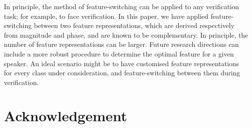 \documentclass{article}
\begin{document}
In principle, the method of feature-switching can be applied to any verification
task; for example, to face verification. In this paper, we have applied
feature-switching between two feature representations, which are derived
respectively from magnitude and phase, and are known to be complementary. In
principle, the number of feature representations can be larger. Future
research directions can include a more robust procedure to determine the optimal
feature for a given speaker. An ideal scenario might be to have customised
feature representations for every class under consideration, and
feature-switching between them during verification.



\section{Acknowledgement}
\label{sec:ack}


\clearpage 



\end{document}
